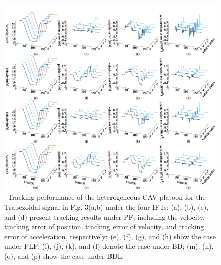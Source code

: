 \documentclass[a4paper]{cas-sc}
\begin{document}
\begin{figure}

  \centering
  \includegraphics[width=14cm]{figs/fig9.png}
  \caption{~Tracking performance of the heterogeneous CAV platoon for the Trapezoidal signal in Fig. 3(a,b) under the four IFTs: (a), (b), (c), and (d) present tracking results under PF, including the velocity, tracking error of position, tracking error of velocity, and tracking error of acceleration, respectively; (e), (f), (g), and (h) show the case under PLF; (i), (j), (k), and (l) denote the case under BD; (m), (n), (o), and (p) show the case under BDL.}
  \label{fig9}
\end{figure}
\end{document}
